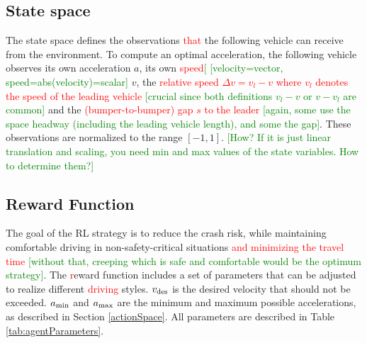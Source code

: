 \documentclass[review]{elsarticle}
\providecommand{\red}[1]{\textcolor{red}{#1}}
\providecommand{\green}[1]{\textcolor{green}{#1}}
\providecommand{\martin}[1]{\red{#1}} %
\providecommand{\martinc}[1]{\green{[#1]}} %
\providecommand{\3}{{\ss}}
\begin{document}
\subsection{State space}
The state space defines the observations \martin{that} the following
vehicle can receive from the environment. To compute an optimal
acceleration, the following vehicle observes its own acceleration $a$,
its own \martin{speed}\martinc{ [velocity=vector, speed=abs(velocity)=scalar}
$v$, the \martin{relative speed $\Delta v=v_l-v$ where $v_l$ denotes
  the speed of the leading vehicle} \martinc{crucial since both definitions
    $v_l-v$ or $v-v_l$ are common} and the \martin{(bumper-to-bumper)
  gap $s$ to the leader} \martinc{again, some use the space headway (including
    the leading vehicle length), and some the gap}. These
observations are normalized to the range $[-1,1]$. \martinc{How? If it
    is just linear translation and scaling, you need min and max
    values of the state variables. How to determine them?}


\subsection{Reward Function}
\label{rewardFunction}
The goal of the RL strategy is to reduce the crash risk, while
maintaining comfortable driving in non-safety-critical situations
\martin{and minimizing the travel time} \martinc{without that, creeping which
    is safe and comfortable would be the optimum strategy}. The
\martin{r}eward function includes a set of parameters that can be
adjusted to realize different \martin{driving} styles. $v_{\rm des}$
is the desired velocity that should not be exceeded. $a_{\rm min}$ and $a_{\rm max}$ are the minimum and maximum possible accelerations, as described in Section \ref{actionSpace}. All parameters are described in Table \ref{tab:agentParameters}.
\end{document}
